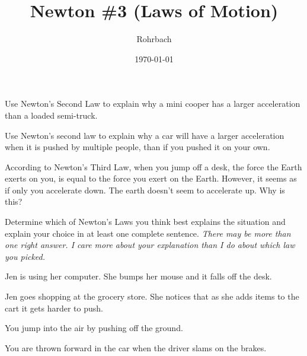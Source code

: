 \documentclass[10pt]{exam}
\title{Newton \#3 (Laws of Motion)}
\author{Rohrbach}
\date{\today}
\begin{document}
\maketitle

\begin{questions}
  
    \question
      Use Newton's Second Law to explain why a mini cooper has a larger acceleration than a loaded semi-truck.
      \vs
    
    \question
      Use Newton's second law to explain why a car will have a larger acceleration when it is pushed by multiple people, than if you pushed it on your own.
      \vs
    
    
    \question 
      According to Newton's Third Law, when you jump off a desk, the force the Earth exerts on you, is equal to the force you exert on the Earth.  However, it seems as if only you accelerate down.  The earth doesn't seem to accelerate up.  Why is this?
      \vs
  
  
  \begin{EnvUplevel}
    Determine which of Newton's Laws you think best explains the situation and explain your choice in at least one complete sentence.  \it There may be more than one right answer.  I care more about your explanation than I do about which law you picked.
  \end{EnvUplevel}
  
    \question 
      Jen is using her computer. She bumps her mouse and it falls off the desk.
      \vs
  
    \question
      Jen goes shopping at the grocery store. She notices that as she adds items to the cart it gets harder to push.
      \vs
    
    \question
      You jump into the air by pushing off the ground.
      \vs
  
    \question
      You are thrown forward in the car when the driver slams on the brakes.
      \vs
  

\end{questions}
\end{document}
